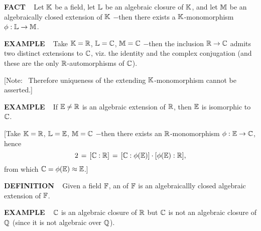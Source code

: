 \begin{x}{\small\bf FACT} \ %
Let $\mathbb{K}$ be a field, let $\mathbb{L}$ be an algebraic closure of $\mathbb{K}$, and let $\mathbb{M}$ be an algebraically closed extension of $\mathbb{K}$ $-$then 
there exists a $\mathbb{K}$-monomorphism $\phi:\mathbb{L} \rightarrow \mathbb{M}$.
\end{x}



\vspace{0.1cm}

\begin{x}{\small\bf EXAMPLE} \ %
Take $\mathbb{K} = \mathbb{R}$, $\mathbb{L} = \mathbb{C}$, $\mathbb{M} = \mathbb{C}$ $-$then the inclusion $\mathbb{R} \rightarrow \mathbb{C}$ admits two distinct extensions to $\mathbb{C}$, 
viz. the identity and the complex conjugation
(and these are the only $\mathbb{R}$-automorphisms of $\mathbb{C}$).

\vspace{0.1cm}

[Note: \ Therefore uniqueness of the extending $\mathbb{K}$-monomorphism cannot be asserted.]
\end{x}

\vspace{0.1cm}



\begin{x}{\small\bf EXAMPLE} \ %
If $\mathbb{E} \neq \mathbb{R}$ is an algebraic extension of $\mathbb{R}$, then $\mathbb{E}$ is isomorphic to $\mathbb{C}$.

\vspace{0.1cm}

[Take $\mathbb{K} = \mathbb{R}$, $\mathbb{L} = \mathbb{E}$, $\mathbb{M} = \mathbb{C}$ $-$then there exists an $\mathbb{R}$-monomorphism 
$\phi:\mathbb{E} \rightarrow \mathbb{C}$, hence 
\[
2 \hspace{0.05cm} = \hspace{0.05cm} [\mathbb{C}:\mathbb{R}] \hspace{0.05cm} = \hspace{0.05cm} [\mathbb{C}:\phi(\mathbb{E})] \cdot [\phi(\mathbb{E}):\mathbb{R}],
\]
from which $\mathbb{C} = \phi(\mathbb{E}) \approx \mathbb{E}$.]
\end{x}


\vspace{0.1cm}

\begin{x}{\small\bf DEFINITION} \ %
Given a field $\mathbb{F}$, an 
of $\mathbb{F}$ is an algebraicallly closed algebraic extension of $\mathbb{F}$.
\end{x}

\vspace{0.1cm}


\begin{x}{\small\bf EXAMPLE} \ %
$\mathbb{C}$ is an algebraic closure of $\mathbb{R}$ but $\mathbb{C}$ is not an algebraic closure of $\mathbb{Q}$ (since it is not algebraic over $\mathbb{Q}$).
\end{x}

